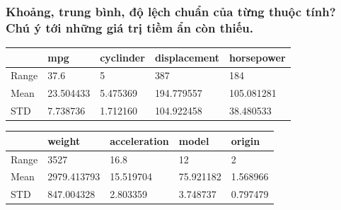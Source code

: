\documentclass[a4paper, 12pt]{article}
\begin{document}
    \subsubsection{Khoảng, trung bình, độ lệch chuẩn của từng thuộc tính? Chú ý tới những giá trị tiềm ẩn còn thiếu.}
        \begin{table}[H]
        \centering
        \begin{tabular}{l|l|l|l|l|}
        \cline{2-5}
                                    & mpg       & cyclinder & displacement & horsepower \\ \hline
        \multicolumn{1}{|l|}{Range} & 37.6      & 5         & 387          & 184        \\ \hline
        \multicolumn{1}{|l|}{Mean}  & 23.504433 & 5.475369  & 194.779557   & 105.081281 \\ \hline
        \multicolumn{1}{|l|}{STD}   & 7.738736  & 1.712160  & 104.922458   & 38.480533  \\ \hline
        \end{tabular}
        \end{table}
        
        \begin{table}[H]
        \centering
        \begin{tabular}{l|l|l|l|l|}
        \cline{2-5}
                                    & weight      & acceleration & model     & origin   \\ \hline
        \multicolumn{1}{|l|}{Range} & 3527        & 16.8         & 12        & 2        \\ \hline
        \multicolumn{1}{|l|}{Mean}  & 2979.413793 & 15.519704    & 75.921182 & 1.568966 \\ \hline
        \multicolumn{1}{|l|}{STD}   & 847.004328  & 2.803359     & 3.748737  & 0.797479 \\ \hline
        \end{tabular}
        \end{table}
        
\end{document}
